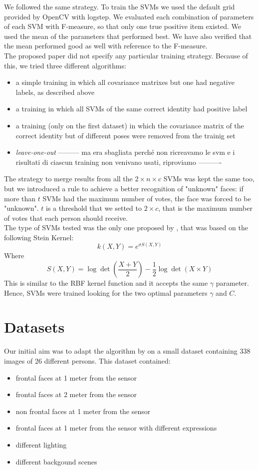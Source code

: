 \documentclass{article}
\begin{document}
We followed the same strategy. To train the SVMs we used the default grid
provided by OpenCV with logstep. We evaluated each combination of parameters of
each SVM with F-measure, so that only one true positive item existed. We used
the mean of the parameters that performed best. We have also verified that the
mean performed good as well with reference to the F-measure.
\\
The proposed paper did not specify any particular training strategy. Because of
this, we tried three different algorithms:
\begin{itemize}
	\item a simple training in which all covariance matrixes but one had
		negative labels, as described above
	\item a training in which all SVMs of the same correct identity had
		positive label
	\item a training (only on the first dataset) in which the covariance
		matrix of the correct identity but of different poses were
		removed from the trainig set
	\item \textit{leave-one-out} --------- ma era sbagliata perché non
		ricreavamo le svm e i risultati di ciascun training non
		venivano usati, riproviamo ----------
\end{itemize}
The strategy to merge results from all the $2 \times n \times c$ SVMs was kept
the same too, but we introduced a rule to achieve a better recognition of
"unknown" faces: if more than $t$ SVMs had the maximum number of votes, the
face was forced to be "unknown". $t$ is a threshold that we setted to $2 \times
c$, that is the maximum number of votes that each person should receive.
\\
The type of SVMs tested was the only one proposed by \citep{Hayat2016}, that
was based on the following Stein Kernel:
$$
k(X, Y) = e^{\sigma S(X,Y)}
$$
Where
$$
S(X, Y) = \log\det\left(\frac{X + Y}{2}\right)-\frac{1}{2} \log \det(X\times Y)
$$
This is similar to the RBF kernel function and it accepts the same $\gamma$
parameter. Hence, SVMs were trained looking for the two optimal parameters
$\gamma$ and $C$.

\section{Datasets}
Our initial aim was to adapt the algorithm by \citep{Hayat2016} on a small dataset
containing 338 images of 26 different persons. This dataset contained:
\begin{itemize}
	\item frontal faces at 1 meter from the sensor
	\item frontal faces at 2 meter from the sensor
	\item non frontal faces at 1 meter from the sensor
	\item frontal faces at 1 meter from the sensor with different expressions
	\item different lighting
	\item different backgound scenes
\end{itemize}
\end{document}
